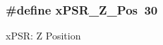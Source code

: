 \subsubsection[{\texorpdfstring{x\+P\+S\+R\+\_\+\+Z\+\_\+\+Pos}{xPSR_Z_Pos}}]{\setlength{\rightskip}{0pt plus 5cm}\#define x\+P\+S\+R\+\_\+\+Z\+\_\+\+Pos~30}\hypertarget{group__CMSIS__CORE_ga5869dd608eea73c80f0567d781d2230b}{}\label{group__CMSIS__CORE_ga5869dd608eea73c80f0567d781d2230b}
x\+P\+SR\+: Z Position 
